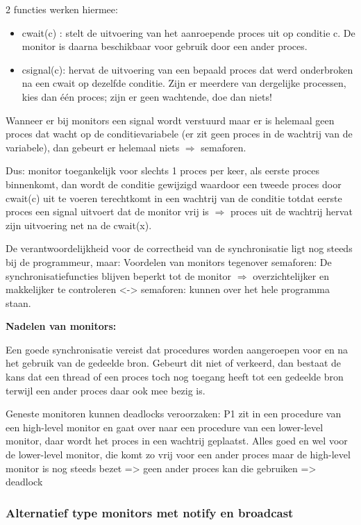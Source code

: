 2 functies werken hiermee:

\begin{itemize}
\item cwait(c) : stelt de uitvoering van het aanroepende proces uit op conditie c. De monitor is daarna beschikbaar voor gebruik door een ander proces.
\item csignal(c): hervat de uitvoering van een bepaald proces dat werd onderbroken na een cwait op dezelfde conditie. Zijn er meerdere van dergelijke processen, kies dan één proces; zijn er geen wachtende, doe dan niets!
\end{itemize}

Wanneer er bij monitors een signal wordt verstuurd maar er is helemaal geen proces dat wacht op de conditievariabele (er zit geen proces in de wachtrij van de variabele), dan gebeurt er helemaal niets $\Rightarrow$ semaforen.

Dus: monitor toegankelijk voor slechts 1 proces per keer, als eerste proces binnenkomt, dan wordt de conditie gewijzigd waardoor een tweede proces door cwait(c) uit te voeren terechtkomt in een wachtrij van de conditie totdat eerste proces een signal uitvoert dat de monitor vrij is $\Rightarrow$  proces uit de wachtrij hervat zijn uitvoering net na de cwait(x).


De verantwoordelijkheid voor de correctheid van de synchronisatie ligt nog steeds bij de programmeur, maar: Voordelen van monitors tegenover semaforen:
De synchronisatiefuncties blijven beperkt tot de monitor $\Rightarrow$  overzichtelijker en makkelijker te controleren <-> semaforen: kunnen over het hele programma staan.

\textbf{Nadelen van monitors:}

Een goede synchronisatie vereist dat procedures worden aangeroepen voor en na het gebruik van de gedeelde bron. Gebeurt dit niet of verkeerd, dan bestaat de kans dat een thread of een proces toch nog toegang heeft tot een gedeelde bron terwijl een ander proces daar ook mee bezig is.

Geneste monitoren kunnen deadlocks veroorzaken: P1 zit in een procedure van een high-level monitor en gaat over naar een procedure van een lower-level monitor, daar wordt het proces in een wachtrij geplaatst. Alles goed en wel voor de lower-level monitor, die komt zo vrij voor een ander proces maar de high-level monitor is nog steeds bezet => geen ander proces kan die gebruiken => deadlock


\subsubsection{Alternatief type monitors met notify en broadcast}

